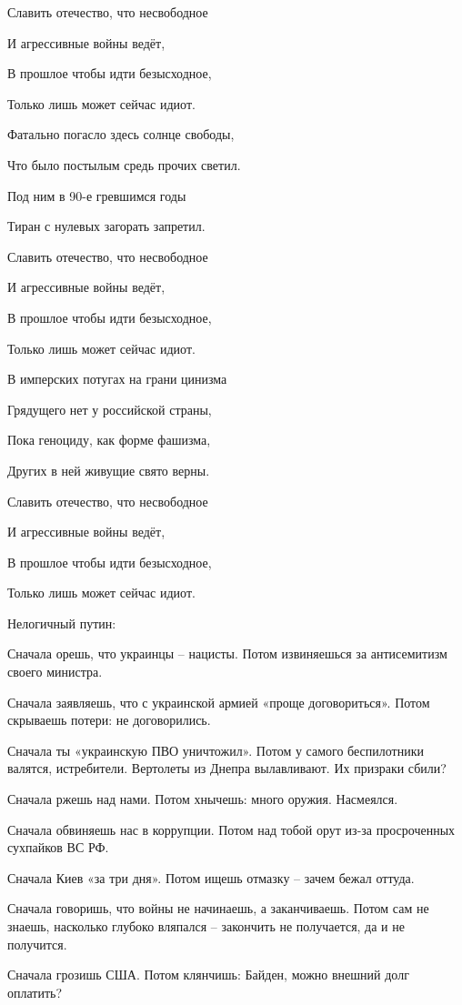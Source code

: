 Славить отечество, что несвободное

И агрессивные войны ведёт,

В прошлое чтобы идти безысходное,

Только лишь может сейчас идиот.


Фатально погасло здесь солнце свободы,

Что было постылым средь прочих светил.

Под ним в 90-е гревшимся годы

Тиран с нулевых загорать запретил.


Славить отечество, что несвободное

И агрессивные войны ведёт,

В прошлое чтобы идти безысходное,

Только лишь может сейчас идиот.


В имперских потугах на грани цинизма

Грядущего нет у российской страны,

Пока геноциду, как форме фашизма,

Других в ней живущие свято верны.


Славить отечество, что несвободное

И агрессивные войны ведёт,

В прошлое чтобы идти безысходное,

Только лишь может сейчас идиот.

Нелогичный путин:

Сначала орешь, что украинцы – нацисты. Потом извиняешься за антисемитизм своего министра.

Сначала заявляешь, что с украинской армией «проще договориться». Потом скрываешь потери: не договорились.

Сначала ты «украинскую ПВО уничтожил». Потом у самого беспилотники валятся, истребители. Вертолеты из Днепра вылавливают. Их призраки сбили?

Сначала ржешь над нами. Потом хнычешь: много оружия. Насмеялся.

Сначала обвиняешь нас в коррупции. Потом над тобой орут из-за просроченных сухпайков ВС РФ.

Сначала Киев «за три дня». Потом ищешь отмазку – зачем бежал оттуда.

Сначала говоришь, что войны не начинаешь, а заканчиваешь. Потом сам не знаешь, насколько глубоко вляпался – закончить не получается, да и не получится.

Сначала грозишь США. Потом клянчишь: Байден, можно внешний долг оплатить?

